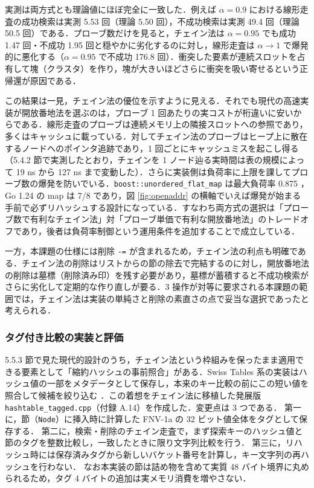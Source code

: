 実測は両方式とも理論値にほぼ完全に一致した．例えば $\alpha=0.9$ における線形走査の成功検索は実測 5.53 回（理論 5.50 回），不成功検索は実測 49.4 回（理論 50.5 回）である．プローブ数だけを見ると，チェイン法は $\alpha=0.95$ でも成功 1.47 回・不成功 1.95 回と穏やかに劣化するのに対し，線形走査は $\alpha \to 1$ で爆発的に悪化する（$\alpha=0.95$ で不成功 176.8 回）．衝突した要素が連続スロットを占有して塊（クラスタ）を作り，塊が大きいほどさらに衝突を吸い寄せるという正帰還が原因である．

この結果は一見，チェイン法の優位を示すように見える．それでも現代の高速実装が開放番地法を選ぶのは，プローブ 1 回あたりの実コストが桁違いに安いからである．線形走査のプローブは連続メモリ上の隣接スロットへの参照であり，多くはキャッシュに載っている．対してチェイン法のプローブはヒープ上に散在するノードへのポインタ追跡であり，1 回ごとにキャッシュミスを起こし得る（5.4.2 節で実測したとおり，チェインを 1 ノード辿る実時間は表の規模によって 19 ns から 127 ns まで変動した）．さらに実装側は負荷率に上限を課してプローブ数の爆発を防いでいる．{\tt boost::unordered\_flat\_map} は最大負荷率 0.875 \cite{munoz2022flat}，Go 1.24 の map は 7/8 \cite{gopratt2025} であり，図 \ref{fig:openaddr} の横軸でいえば爆発が始まる手前で必ずリハッシュする設計になっている．すなわち両方式の選択は「プローブ数で有利なチェイン法」対「プローブ単価で有利な開放番地法」のトレードオフであり，後者は負荷率制御という運用条件を追加することで成立している．

一方，本課題の仕様には削除 {\tt -=} が含まれるため，チェイン法の利点も明確である．チェイン法の削除はリストからの節の除去で完結するのに対し，開放番地法の削除は墓標（削除済み印）を残す必要があり，墓標が蓄積すると不成功検索がさらに劣化して定期的な作り直しが要る．3 操作が対等に要求される本課題の範囲では，チェイン法は実装の単純さと削除の素直さの点で妥当な選択であったと考えられる．

\subsubsection{タグ付き比較の実装と評価}

5.5.3 節で見た現代的設計のうち，チェイン法という枠組みを保ったまま適用できる要素として「縮約ハッシュの事前照合」がある．Swiss Tables 系の実装はハッシュ値の一部をメタデータとして保存し，本来のキー比較の前にこの短い値を照合して候補を絞り込む \cite{munoz2022flat,gopratt2025}．この着想をチェイン法に移植した発展版 {\tt hashtable\_tagged.cpp}（付録 A.14）を作成した．変更点は 3 つである．
第一に，節（{\tt Node}）に挿入時に計算した FNV-1a の 32 ビット値全体をタグとして保存する．
第二に，検索・削除のチェイン走査で，まず探索キーのハッシュ値と節のタグを整数比較し，一致したときに限り文字列比較を行う．
第三に，リハッシュ時には保存済みタグから新しいバケット番号を計算し，キー文字列の再ハッシュを行わない．
なお本実装の節は詰め物を含めて実質 48 バイト境界に丸められるため，タグ 4 バイトの追加は実メモリ消費を増やさない．

